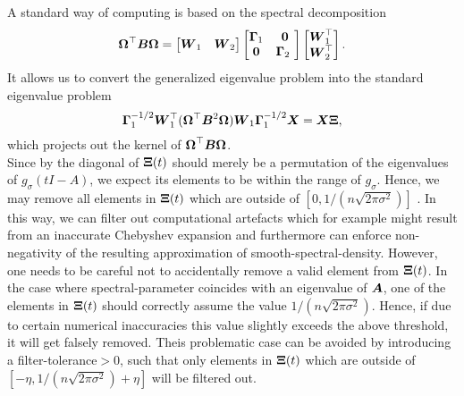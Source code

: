 A standard way of computing 
is based on the spectral decomposition
\begin{equation}
    \boldsymbol{\Omega}^{\top} \boldsymbol{B} \boldsymbol{\Omega} = \begin{bmatrix} \boldsymbol{W}_1 & \boldsymbol{W}_2 \end{bmatrix} 
    \begin{bmatrix} \boldsymbol{\Gamma}_1 & \boldsymbol{0} \\ \boldsymbol{0} & \boldsymbol{\Gamma}_2 \ \end{bmatrix} 
    \begin{bmatrix} \boldsymbol{W}_1^{\top} \\ \boldsymbol{W}_2^{\top} \end{bmatrix}.
\end{equation}
It allows us to convert the generalized eigenvalue problem 
into the standard eigenvalue problem
\begin{equation}
    \boldsymbol{\Gamma}_1^{-1/2} \boldsymbol{W}_1^{\top} (\boldsymbol{\Omega}^{\top} \boldsymbol{B}^2 \boldsymbol{\Omega}) \boldsymbol{W}_1 \boldsymbol{\Gamma}_1^{-1/2} \boldsymbol{X} = \boldsymbol{X} \boldsymbol{\Xi},
    \label{equ:3-nystrom-converted-generalized-eigenvalue-problem}
\end{equation}
which projects out the kernel of $\boldsymbol{\Omega}^{\top} \boldsymbol{B} \boldsymbol{\Omega}$.\\

Since by  the diagonal of $\boldsymbol{\Xi}(t)$
should merely be a permutation of the eigenvalues of $g_{\sigma}(tI - A)$,
we expect its elements to be within the range of $g_{\sigma}$. Hence, we may remove
all elements in $\boldsymbol{\Xi}(t)$ which are outside of $[0, 1 / (n \sqrt{2 \pi \sigma^2})]$ \cite{lin2017randomized}.
In this way, we can filter out computational artefacts which for example might result
from an inaccurate Chebyshev expansion and furthermore 
can enforce non-negativity of the resulting approximation of
\gls{smooth-spectral-density}. However, one needs to be careful not to accidentally
remove a valid element from $\boldsymbol{\Xi}(t)$. In the case where \gls{spectral-parameter}
coincides with an eigenvalue of $\boldsymbol{A}$, one of the elements in $\boldsymbol{\Xi}(t)$
should correctly assume the value $1 / (n \sqrt{2 \pi \sigma^2})$. Hence, if due to
certain numerical inaccuracies this value slightly exceeds the above threshold,
it will get falsely removed. Theis problematic case can be avoided by introducing a
\gls{filter-tolerance}$>0$, such that only elements in $\boldsymbol{\Xi}(t)$ which are
outside of $[-\eta, 1 / (n \sqrt{2 \pi \sigma^2}) + \eta]$ will be filtered out. \\

